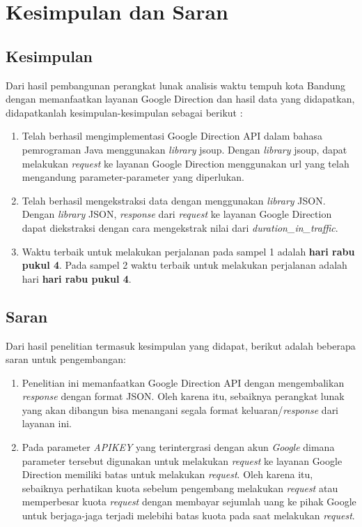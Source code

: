 \chapter{Kesimpulan dan Saran}
\label{chap:kesimpulandansaran}

\section{Kesimpulan}
\label{sec:kesimpulan}

Dari hasil pembangunan perangkat lunak analisis waktu tempuh kota Bandung dengan memanfaatkan layanan Google Direction dan hasil data yang didapatkan, didapatkanlah kesimpulan-kesimpulan sebagai berikut :

\begin{enumerate} 
	\item Telah berhasil mengimplementasi Google Direction API dalam bahasa pemrograman Java menggunakan \textit{library} jsoup. Dengan \textit{library} jsoup, dapat melakukan \textit{request} ke layanan Google Direction menggunakan url yang telah mengandung parameter-parameter yang diperlukan. 
	\item Telah berhasil mengekstraksi data dengan menggunakan \textit{library} JSON. Dengan \textit{library} JSON, \textit{response} dari \textit{request} ke layanan Google Direction dapat diekstraksi dengan cara mengekstrak nilai dari \textit{duration\_in\_traffic}.
	\item Waktu terbaik untuk melakukan perjalanan pada sampel 1 adalah \textbf{hari rabu pukul 4}. Pada sampel 2 waktu terbaik untuk melakukan perjalanan adalah hari \textbf{hari rabu pukul 4}.
\end{enumerate}

\section{Saran}
\label{sec:saran}

Dari hasil penelitian termasuk kesimpulan yang didapat, berikut adalah beberapa saran untuk pengembangan:

\begin{enumerate} 
	\item Penelitian ini memanfaatkan Google Direction API dengan mengembalikan \textit{response} dengan format JSON. Oleh karena itu, sebaiknya perangkat lunak yang akan dibangun bisa menangani segala format keluaran/\textit{response} dari layanan ini.
	\item Pada parameter \textit{APIKEY} yang terintergrasi dengan akun \textit{Google} dimana parameter tersebut digunakan untuk melakukan \textit{request} ke layanan Google Direction memiliki batas untuk melakukan \textit{request}. Oleh karena itu, sebaiknya perhatikan kuota sebelum pengembang melakukan \textit{request} atau memperbesar kuota \textit{request} dengan membayar sejumlah uang ke pihak Google untuk berjaga-jaga terjadi melebihi batas kuota pada saat melakukan \textit{request}.
\end{enumerate}